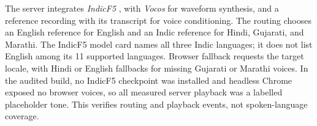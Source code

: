 The server integrates \emph{IndicF5} \citep{ai4bharat2025indicf5}, with \emph{Vocos} \citep{siuzdak2023vocos} for waveform synthesis, and a reference recording with its transcript for voice conditioning.
The routing chooses an English reference for English and an Indic reference for Hindi, Gujarati, and Marathi.
The IndicF5 model card names all three Indic languages; it does not list English among its 11 supported languages.
Browser fallback requests the target locale, with Hindi or English fallbacks for missing Gujarati or Marathi voices.
In the audited build, no IndicF5 checkpoint was installed and headless Chrome exposed no browser voices, so all measured server playback was a labelled placeholder tone.
This verifies routing and playback events, not spoken-language coverage.
